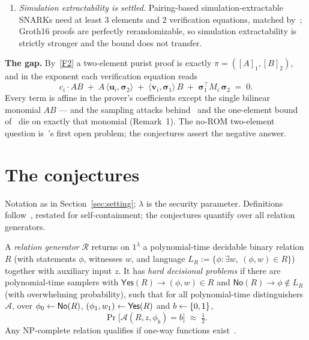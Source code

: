 \documentclass{aicr-conjecture}
\newcommand{\bsig}{\boldsymbol{\sigma}}
\newcommand{\LR}{L_R}
\newcommand{\Yes}{\mathsf{Yes}}
\newcommand{\No}{\mathsf{No}}
\begin{document}
\begin{enumerate}[label=(F\arabic*),ref=F\arabic*,leftmargin=*,itemsep=1pt,topsep=2pt]
  bits~\cite{DMS24}.  Element count and bit count thus part ways;
  the conjectures concern the former.
  (d)~\emph{Interaction; designated verifiers.}  One round of
  interaction yields one-element proofs~\cite{BIOW20};
  designated-verifier SNARGs reach one element plus $O(\lambda)$
  bits~\cite{ADI25}.  Non-interactivity and public verifiability are
  load-bearing too.
\item\label{F4} \emph{Simulation extractability is settled.}
  Pairing-based simulation-extractable SNARKs need at least $3$
  elements and $2$ verification equations, matched by~\cite{GM17};
  Groth16 proofs are perfectly rerandomizable, so simulation
  extractability is strictly stronger and the bound does not
  transfer.
\end{enumerate}

\smallskip
\noindent\textbf{The gap.}
By~\ref{F2} a two-element purist proof is exactly
$\pi = ([A]_1,[B]_2)$, and in the exponent each verification equation
reads
\[
  c_i \cdot AB \;+\; A\,\langle \boldsymbol{u}_i, \bsig_2\rangle
  \;+\; \langle \boldsymbol{v}_i, \bsig_1\rangle\, B
  \;+\; \bsig_1^{\!\top} M_i\, \bsig_2 \;=\; 0 .
\]
Every term is affine in the prover's coefficients except the single
bilinear monomial $AB$ --- and the sampling attacks
behind~\cite[Thms.~3--4]{Gro16} and the one-element bound
of~\cite{ADY25} die on exactly that monomial (Remark~1).  The no-ROM
two-element question is~\cite{ADY25}'s first open problem; the
conjectures assert the negative answer.

\section{The conjectures}\label{sec:conjectures}

Notation as in Section~\ref{sec:setting}; $\lambda$ is the security
parameter.  Definitions follow~\cite{Gro16}, restated for
self-containment; the conjectures quantify over all relation
generators.

\begin{definition}\label{def:hard}
A \emph{relation generator} $\mathcal{R}$ returns on $1^\lambda$ a
polynomial-time decidable binary relation $R$ (with statements
$\phi$, witnesses $w$, and language
$\LR := \{\phi : \exists w,\ (\phi,w) \in R\}$) together with
auxiliary input $z$.  It has \emph{hard decisional problems} if there
are polynomial-time samplers with $\Yes(R) \to (\phi,w) \in R$ and
$\No(R) \to \phi \notin \LR$ (with overwhelming probability), such
that for all polynomial-time distinguishers $\mathcal{A}$, over
$\phi_0 \sample \No(R)$, $(\phi_1,w_1) \sample \Yes(R)$ and
$b \leftarrow \{0,1\}$,
\[
  \Pr\bigl[\mathcal{A}(R,z,\phi_b) = b\bigr] \;\approx\; \tfrac12 .
\]
Any NP-complete relation qualifies if one-way functions
exist~\cite{Gro16}.
\end{definition}
\end{document}

